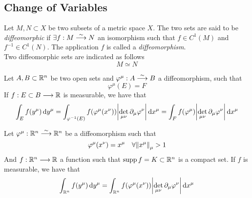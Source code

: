 \documentclass[../complete.tex]{subfiles}
\begin{document}
\subsection{Change of Variables}
\begin{dfn}[Diffeomorphism]
	Let $M,N\subset X$ be two subsets of a metric space $X$. The two sets are said to be \textit{diffeomorphic} if $\exists f:M\fto[\sim]N$ an isomorphism such that $f\in C^1(M)$ and $f^{-1}\in C^1(N)$. The application $f$ is called a \textit{diffeomorphism}.\\
	Two diffeomorphic sets are indicated as follows
	\begin{equation*}
		M\simeq N
	\end{equation*}
\end{dfn}
\begin{thm}
	Let $A,B\subset\R^n$ be two open sets and $\varphi^\mu:A\fto[\sim]B$ a diffeomorphism, such that
	\begin{equation*}
		\varphi^\mu(E)=F
	\end{equation*}
	If $f:E\subset B\fto\R$ is measurable, we have that
	\begin{equation*}
		\int_{E}^{}f(y^\mu)\diff y^\mu=\int_{\varphi^{-1}(E)}^{}f(\varphi^\mu(x^\nu))\abs{\det_{\mu\nu}\del_\mu\varphi^\nu}\diff x^\mu=\int_{F}^{}f(\varphi^\mu)\abs{\det_{\mu\nu}\del_\mu\varphi^\nu}\diff x^\mu
	\end{equation*}
\end{thm}
\begin{thm}
	Let $\varphi^\mu:\R^n\fto[\sim]\R^n$ be a diffeomorphism such that
	\begin{equation*}
		\varphi^\mu(x^\nu)=x^\mu\quad\forall\norm{x^\mu}_\mu>1
	\end{equation*}
	And $f:\R^n\fto\R$ a function such that $\supp{f}=K\subset\R^n$ is a compact set. If $f$ is measurable, we have that
	\begin{equation}
		\int_{\R^n}^{}f(y^\mu)\diff y^\mu=\int_{\R^n}^{}f(\varphi^\mu(x^\nu))\abs{\det_{\mu\nu}\del_\mu\varphi^\nu}\diff x^\mu
		\label{eq:changevar}
	\end{equation}
\end{thm}
\end{document}
